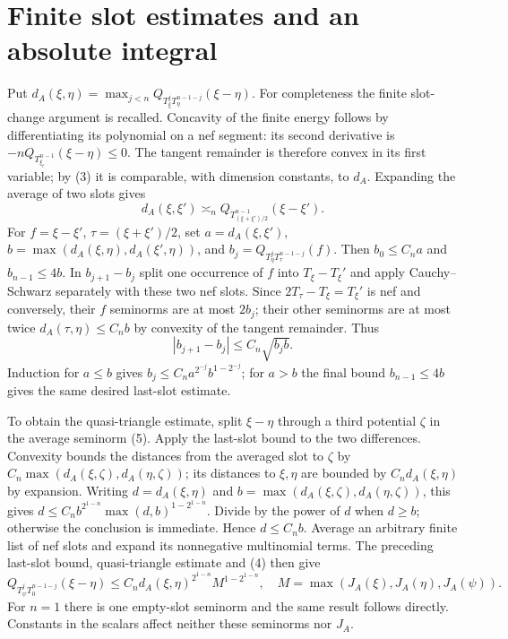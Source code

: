 \documentclass[11pt]{article}
\begin{document}
\section{Finite slot estimates and an absolute integral}
Put $d_A(\xi,\eta)=\max_{j<n}Q_{T_\xi^jT_\eta^{n-1-j}}(\xi-\eta)$.
For completeness the finite slot-change argument is recalled.
Concavity of the finite energy follows by differentiating its
polynomial on a nef segment: its second derivative is
$-nQ_{T_{\xi_t}^{n-1}}(\xi-\eta)\leq0$.
The tangent remainder is therefore convex in its first variable;
by (3) it is comparable, with dimension constants, to $d_A$.
Expanding the average of two slots gives
\[
 d_A(\xi,\xi')\asymp_n
 Q_{T_{(\xi+\xi')/2}^{n-1}}(\xi-\xi').                    \tag{5}
\]
For $f=\xi-\xi'$, $\tau=(\xi+\xi')/2$, set
$a=d_A(\xi,\xi')$, $b=\max(d_A(\xi,\eta),d_A(\xi',\eta))$,
and $b_j=Q_{T_\eta^jT_\tau^{n-1-j}}(f)$.
Then $b_0\leq C_na$ and $b_{n-1}\leq4b$.
In $b_{j+1}-b_j$ split one occurrence of $f$ into
$T_\xi-T_\xi'$ and apply Cauchy--Schwarz separately with these
two nef slots. Since $2T_\tau-T_\xi=T_\xi'$ is nef and conversely,
their $f$ seminorms are at most $2b_j$; their other seminorms
are at most twice $d_A(\tau,\eta)\leq C_nb$ by convexity of the
tangent remainder. Thus
\[
 |b_{j+1}-b_j|\leq C_n\sqrt{b_jb}.
\]
Induction for $a\leq b$ gives
$b_j\leq C_na^{2^{-j}}b^{1-2^{-j}}$; for $a>b$ the final
bound $b_{n-1}\leq4b$ gives the same desired last-slot estimate.

To obtain the quasi-triangle estimate, split $\xi-\eta$ through a
third potential $\zeta$ in the average seminorm (5). Apply the
last-slot bound to the two differences. Convexity bounds the distances
from the averaged slot to $\zeta$ by
$C_n\max(d_A(\xi,\zeta),d_A(\eta,\zeta))$; its distances to
$\xi,\eta$ are bounded by $C_nd_A(\xi,\eta)$ by expansion.
Writing $d=d_A(\xi,\eta)$ and
$b=\max(d_A(\xi,\zeta),d_A(\eta,\zeta))$, this gives
$d\leq C_nb^{2^{1-n}}\max(d,b)^{1-2^{1-n}}$.
Divide by the power of $d$ when $d\geq b$; otherwise the conclusion
is immediate. Hence $d\leq C_nb$.
Average an arbitrary finite list of nef slots and expand its
nonnegative multinomial terms. The preceding last-slot bound,
quasi-triangle estimate and (4) then give
\[
 Q_{T_\psi^jT_0^{n-1-j}}(\xi-\eta)
 \leq C_n d_A(\xi,\eta)^{2^{1-n}}
       M^{1-2^{1-n}},\quad
 M=\max(J_A(\xi),J_A(\eta),J_A(\psi)).                    \tag{6}
\]
For $n=1$ there is one empty-slot seminorm and the same result
follows directly. Constants in the scalars affect neither these
seminorms nor $J_A$.
\end{document}
